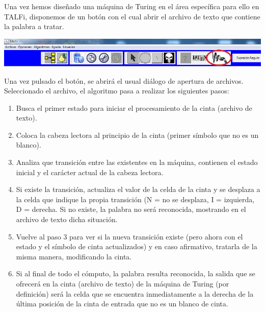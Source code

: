 \documentclass[12pt,a4paper,spanish]{book}
\begin{document}
Una vez hemos dise\~nado una m\'aquina de Turing en el \'area espec\'ifica para ello en TALFi, disponemos de un bot\'on con el cual abrir el archivo de texto que contiene la palabra a tratar.

\begin{center}
\includegraphics[width=\textwidth]{turi2.jpg}
\end{center}

Una vez pulsado el bot\'on, se abrir\'a el usual di\'alogo de apertura de archivos. Seleccionado el archivo, el algoritmo pasa a realizar los siguientes pasos:
\begin{enumerate}
\item Busca el primer estado para iniciar el procesamiento de la cinta (archivo de texto).
\item Coloca la cabeza lectora al principio de la cinta (primer s\'imbolo que no es un blanco).
\item Analiza que transici\'on entre las existentes en la m\'aquina, contienen el estado inicial y el car\'acter actual de la cabeza lectora.
\item Si existe la transici\'on, actualiza el valor de la celda de la cinta y se desplaza a la celda que indique la propia transici\'on (N =  no se desplaza, I = izquierda, D = derecha. Si no existe, la palabra no ser\'a reconocida, mostrando en el archivo de texto dicha situaci\'on.
\item Vuelve al paso 3 para ver si la nueva transici\'on existe (pero ahora con el estado y el s\'imbolo de cinta actualizados) y en caso afirmativo, tratarla de la misma manera, modificando la cinta.
\item Si al final de todo el c\'omputo, la palabra resulta reconocida, la salida que se ofrecer\'a en la cinta (archivo de texto) de la m\'aquina de Turing (por definici\'on) ser\'a la celda que se encuentra inmediatamente a la derecha de la \'ultima posici\'on de la cinta de entrada que no es un blanco de cinta.
\end{enumerate}
\end{document}
